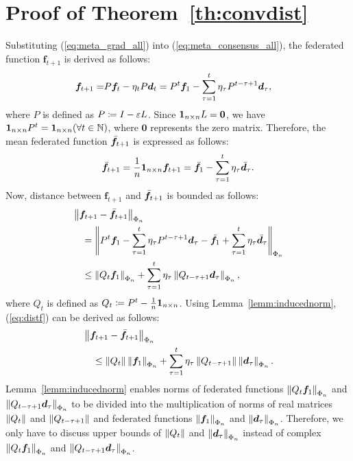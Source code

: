 \documentclass[journal]{IEEEtran}
\begin{document}
\section{Proof of Theorem~\ref{th:convdist}} \label{sec:app_convdist}
Substituting (\ref{eq:meta_grad_all}) into (\ref{eq:meta_consensus_all}), the federated function $\bm{f}_{t+1}$ is derived as follows:
\begin{align}
  \bm{f}_{t+1}
     =& P \bm{f}_t - \eta_t P \bm{d}_t
     = P^{t} \bm{f}_1 - \sum_{\tau=1}^{t} \eta_{\tau} P^{t-\tau+1} \bm{d}_{\tau},
\end{align}
where $P$ is defined as $P\coloneqq I - \varepsilon L$.
Since $\bm{1}_{n\times n} L=\bm{0}$, we have $\bm{1}_{n\times n} P^t = \bm{1}_{n\times n} (\forall t \in \mathbb{N})$, where $\bm{0}$ represents the zero matrix.
Therefore, the mean federated function $\bar{\bm{f}}_{t+1}$ is expressed as follows:
\begin{align}
  \bar{\bm{f}}_{t+1}
    = \frac{1}{n} \bm{1}_{n\times n} \bm{f}_{t+1}
    = \bar{\bm{f}}_1 - \sum_{\tau=1}^{t}\eta_\tau \bar{\bm{d}}_\tau. \label{eq:mean_f}
\end{align}
Now, distance between $\bm{f}_{t+1}$ and $\bar{\bm{f}}_{t+1}$ is bounded as follows:
\begin{align}
  &\left\lVert \bm{f}_{t+1} - \bar{\bm{f}}_{t+1} \right\rVert_{\Phi_{n}} \nonumber \\
      & \quad = \left\lVert P^t \bm{f}_1
             - \sum_{\tau=1}^{t}\eta_\tau P^{t-\tau+1} \bm{d}_\tau
             - \bar{\bm{f}}_1 + \sum_{\tau=1}^{t}\eta_\tau \bar{\bm{d}}_\tau \right\rVert_{\Phi_{n}} \nonumber \\
      &\quad \le \left\lVert Q_t\bm{f}_1 \right\rVert_{\Phi_{n}} + \sum_{\tau=1}^{t}\eta_\tau \left\lVert Q_{t-\tau+1}\bm{d}_{\tau} \right\rVert_{\Phi_{n}}, \label{eq:distf}
\end{align}
where $Q_t$ is defined as $Q_t \coloneqq P^t - \frac{1}{n}\bm{1}_{n\times n}$.
Using Lemma~\ref{lemm:inducednorm}, (\ref{eq:distf}) can be derived as follows:
\begin{align}
  &\left\lVert \bm{f}_{t+1} - \bar{\bm{f}}_{t+1} \right\rVert_{\Phi_{n}} \nonumber \\
      &\quad \le \left\lVert Q_t \right\rVert\left\lVert \bm{f}_1 \right\rVert_{\Phi_{n}} + \sum_{\tau=1}^{t}\eta_\tau \left\lVert Q_{t-\tau+1} \right\rVert\left\lVert \bm{d}_{\tau} \right\rVert_{\Phi_{n}}. \label{eq:distf2}
\end{align}
Lemma~\ref{lemm:inducednorm} enables
norms of federated functions $\left\lVert Q_t\bm{f}_1 \right\rVert_{\Phi_{n}}$ and $\left\lVert Q_{t-\tau+1}\bm{d}_{\tau} \right\rVert_{\Phi_{n}}$
to be divided into the multiplication of norms of real matrices $\left\lVert Q_t \right\rVert$ and $\left\lVert Q_{t-\tau+1} \right\rVert$
and federated functions $\left\lVert \bm{f}_1 \right\rVert_{\Phi_{n}}$ and $\left\lVert \bm{d}_\tau \right\rVert_{\Phi_{n}}$.
Therefore, we only have to discuss upper bounds of $\left\lVert Q_t \right\rVert$ and $\left\lVert \bm{d}_{\tau} \right\rVert_{\Phi_{n}}$
instead of complex $\left\lVert Q_t\bm{f}_1 \right\rVert_{\Phi_{n}}$ and $\left\lVert Q_{t-\tau+1}\bm{d}_{\tau} \right\rVert_{\Phi_{n}}$.
\end{document}
